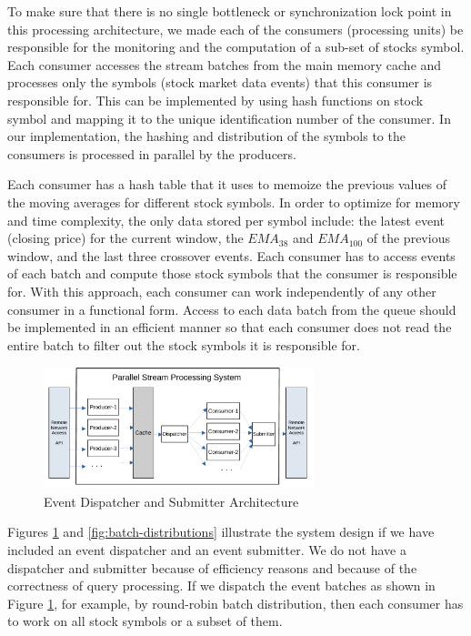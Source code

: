 To make sure that there is no single bottleneck or synchronization lock point in this processing architecture, we made each of the consumers
(processing units) be responsible for the monitoring and the computation of a sub-set of stocks symbol. Each consumer accesses the stream batches
from the main memory cache and processes only the symbols (stock market data events) that this consumer is responsible for.
This can be implemented by using hash functions on stock symbol and mapping it to the unique identification number of the consumer.
In our implementation, the hashing and distribution of the symbols to the consumers is processed in parallel by the producers.

Each consumer has a hash table that it uses to memoize the previous values of the moving averages for different stock symbols. In order to optimize for memory and time complexity, the only data stored per symbol include: the latest event (closing price) for the current window, the $EMA_{38}$ and $EMA_{100}$ of the previous window, and the last three crossover events.
Each consumer has to access events of each batch and compute those stock symbols that the consumer is responsible for. With this approach, each consumer can work independently of any other consumer in a functional form. Access to each data batch from the queue should be implemented in an efficient manner so that each consumer does not read the entire batch to filter out the stock symbols it is responsible for.

\begin{figure}[!ht]
    \begin{center}
        \includegraphics[width=0.7\textwidth]{./images/Parallel-Stream-Processing-System}
        \caption{Event Dispatcher and Submitter Architecture}
        \label{fig:parallel-srream-processing}
    \end{center}
\end{figure}


Figures \ref{fig:parallel-srream-processing} and \ref{fig:batch-distributions} illustrate the system design if we have included an event dispatcher and an event submitter. We do not have a dispatcher and submitter because of efficiency reasons and because of the correctness of query processing. If we dispatch the event batches as shown in Figure \ref{fig:parallel-srream-processing}, for example, by round-robin batch distribution, then each consumer has to work on all stock symbols or a subset of them.

